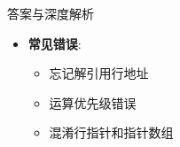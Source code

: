 \documentclass[a4paper,12pt]{article}
\begin{document}
\begin{bluebox}{答案与深度解析}
\begin{itemize}[leftmargin=*, nosep]
		\item \textbf{常见错误}:
		      \begin{itemize}
			      \item 忘记解引用行地址
			      \item 运算优先级错误
			      \item 混淆行指针和指针数组
		      \end{itemize}
	\end{itemize}
\end{bluebox}
\end{document}
